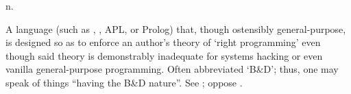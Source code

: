  n.

A language (such as , , APL, or Prolog) that,
though ostensibly general-purpose, is designed so as to enforce an author's
theory of `right programming' even though said theory is demonstrably inadequate
for systems hacking or even vanilla general-purpose programming. Often
abbreviated `B\&D'; thus, one may speak of things ``having the B\&D nature''.
See ; oppose .

